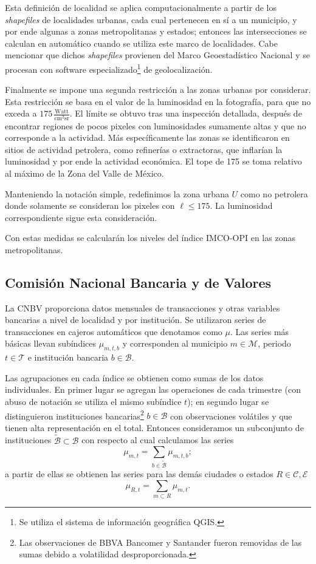 \documentclass[]{article}
\let\rmarkdownfootnote\footnote%
\def\footnote{\protect\rmarkdownfootnote}
\begin{document}
Esta definición de localidad se aplica computacionalmente a partir de
los \emph{shapefiles} de localidades urbanas, cada cual pertenecen en sí
a un municipio, y por ende algunas a zonas metropolitanas y estados;
entonces las intersecciones se calculan en automático cuando se utiliza
este marco de localidades. Cabe mencionar que dichos \emph{shapefiles}
provienen del Marco Geoestadístico Nacional y se procesan con software
especializado\footnote{Se utiliza el sistema de información geográfica
  QGIS.} de geolocalización.

Finalmente se impone una segunda restricción a las zonas urbanas por
considerar. Esta restricción se basa en el valor de la luminosidad en la
fotografía, para que no exceda a
\(175\,\frac{\text{Watt}}{\text{cm}^2 \text{sr}}\). El límite se obtuvo
tras una inspección detallada, después de encontrar regiones de pocos
pixeles con luminosidades sumamente altas y que no corresponde a la
actividad. Más específicamente las zonas se identificaron en sitios de
actividad petrolera, como refinerías o extractoras, que inflarían la
luminosidad y por ende la actividad económica. El tope de 175 se toma
relativo al máximo de la Zona del Valle de México.

Manteniendo la notación simple, redefinimos la zona urbana \(U\) como no
petrolera donde solamente se consideran los pixeles con
\(\ell \leq 175\). La luminosidad correspondiente sigue esta
consideración.

Con estas medidas se calcularán los niveles del índice IMCO-OPI en las
zonas metropolitanas.

\subsection{Comisión Nacional Bancaria y de
Valores}\label{comision-nacional-bancaria-y-de-valores}

La CNBV proporciona datos mensuales de transacciones y otras variables
bancarias a nivel de localidad y por institución. Se utilizaron series
de transacciones en cajeros automáticos que denotamos como \(\mu\). Las
series más básicas llevan subíndices \(\mu_{m,t,b}\) y corresponden al
municipio \(m \in \mathcal{M}\), periodo \(t \in \mathcal{T}\) e
institución bancaria \(b \in \mathcal{B}\).

Las agrupaciones en cada índice se obtienen como sumas de los datos
individuales. En primer lugar se agregan las operaciones de cada
trimestre (con abuso de notación se utiliza el mismo subíndice \(t\));
en segundo lugar se distinguieron instituciones bancarias\footnote{Las
  observaciones de BBVA Bancomer y Santander fueron removidas de las
  sumas debido a volatilidad desproporcionada.} \(b \in \mathcal{B}\)
con observaciones volátiles y que tienen alta representación en el
total. Entonces consideramos un subconjunto de instituciones
\(\tilde{\mathcal{B}} \subset \mathcal{B}\) con respecto al cual
calculamos las series
\[ \mu_{m,t} = \sum_{b \in \tilde{\mathcal{B}}} \mu_{m,t,b}; \] a partir
de ellas se obtienen las series para las demás ciudades o estados
\(R \in \mathcal{C, E}\) \[ \mu_{R,t} = \sum_{m \subset R}\mu_{m,t}.\]
\end{document}
